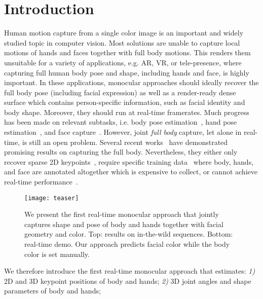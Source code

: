 \documentclass[final]{cvpr}
\begin{document}
\section{Introduction}
Human motion capture from a single color image is an important and widely studied topic in computer vision.
Most solutions are unable to capture local motions of hands and faces together with full body motions.
This renders them unsuitable for a variety of applications, e.g. AR, VR, or tele-presence, where capturing full human body pose and shape, including hands and face, is highly important.
In these applications, monocular approaches should ideally recover the full body pose (including facial expression) as well as a render-ready dense surface which contains person-specific information, such as facial identity and body shape.
Moreover, they should run at real-time framerates.
Much progress has been made on relevant subtasks, i.e. body pose estimation~\cite{kolotouros2019learning,kanazawa2018end,omran2018neural,mehta2017vnect}, hand pose estimation~\cite{zhou2020monocular,mueller2018ganerated,zimmermann2019freihand}, and face capture~\cite{egger20203d,tewari2017mofa,tewari2018self,sengupta2018sfsnet,zollhofer2018state}.
However, joint \textit{full body} capture, let alone in real-time, is still an open problem.
Several recent works~\cite{choutas2020monocular,xiang2019monocular,jin2020whole,pavlakos2019expressive,martinez2019single} have demonstrated promising results on capturing the full body.
Nevertheless, they either only recover sparse 2D keypoints~\cite{martinez2019single,jin2020whole}, require specific training data~\cite{choutas2020monocular,jin2020whole} where body, hands, and face are annotated altogether which is expensive to collect, or cannot achieve real-time performance~\cite{choutas2020monocular,xiang2019monocular,pavlakos2019expressive,martinez2019single}.
\begin{figure}[t]
  \centering
  \texttt{[image: teaser]}
  \caption{
We present the first real-time monocular approach that jointly captures shape and pose of body and hands together with facial geometry and color.
Top: results on in-the-wild sequences.
Bottom: real-time demo.
Our approach predicts facial color while the body color is set manually.
}
  \label{fig:teaser}
\end{figure}
\par
We therefore introduce the first real-time monocular approach that estimates:
\textit{1)} 2D and 3D keypoint positions of body and hands;
\textit{2)} 3D joint angles and shape parameters of body and hands;
\end{document}
